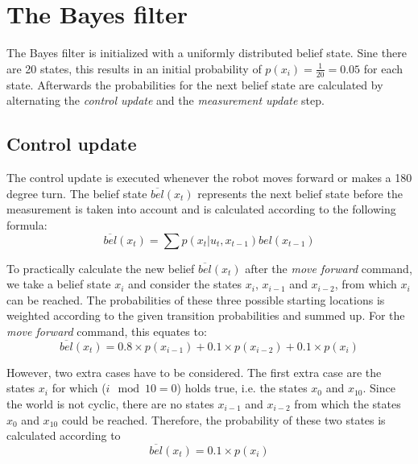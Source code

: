 \documentclass[10pt,a4paper]{article}
\begin{document}
	\section{The Bayes filter}
	The Bayes filter is initialized with a uniformly distributed belief state. Sine there are 20 states, this results in an initial probability of $p(x_i)=\frac{1}{20}=0.05$ for each state. Afterwards the probabilities for the next belief state are calculated by alternating the \textit{control update} and the \textit{measurement update} step.
	
		\subsection{Control update}
		The control update is executed whenever the robot moves forward or makes a 180 degree turn. The belief state $\overline{bel}(x_t)$ represents the next belief state before the measurement is taken into account and is calculated according to the following formula:
		\begin{displaymath}
			\overline{bel}(x_t) = \sum p(x_t|u_t,x_{t-1})bel(x_{t-1})
		\end{displaymath}
		
		To practically calculate the new belief $\overline{bel}(x_t)$ after the \textit{move forward} command, we take a belief state $x_i$ and consider the states $x_i$, $x_{i-1}$ and $x_{i-2}$, from which $x_i$ can be reached. The probabilities of these three possible starting locations is weighted according to the given transition probabilities and summed up. For the \textit{move forward} command, this equates to:
		\begin{displaymath}
			\overline{bel}(x_t) = 0.8\times p(x_{i-1}) + 0.1\times p(x_{i-2}) + 0.1\times p(x_i)
		\end{displaymath}
		
		However, two extra cases have to be considered. The first extra case are the states $x_i$ for which ($i \mod{10} = 0$) holds true, i.e. the states $x_0$ and $x_{10}$. Since the world is not cyclic, there are no states $x_{i-1}$ and $x_{i-2}$ from which the states $x_0$ and $x_{10}$ could be reached. Therefore, the probability of these two states is calculated according to
		\begin{displaymath}
			\overline{bel}(x_t) = 0.1\times p(x_i)
		\end{displaymath}
		
\end{document}
